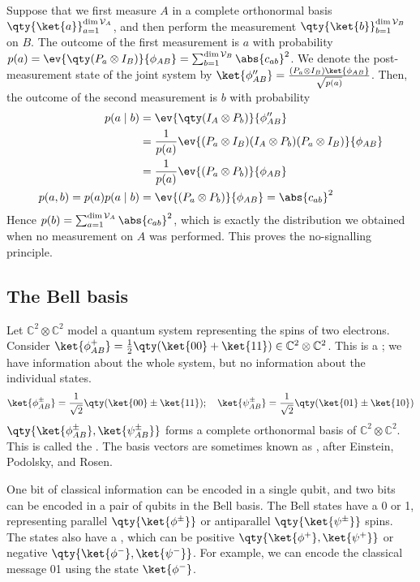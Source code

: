Suppose that we first measure $A$ in a complete orthonormal basis $\qty{\ket{a}}_{a=1}^{\dim \mathcal V_A}$, and then perform the measurement $\qty{\ket{b}}_{b=1}^{\dim \mathcal V_B}$ on $B$.
The outcome of the first measurement is $a$ with probability $p(a) = \ev{\qty(P_a \otimes I_B)}{\phi_{AB}} = \sum_{b=1}^{\dim \mathcal V_B} \abs{c_{ab}}^2$.
We denote the post-measurement state of the joint system by $\ket{\phi_{AB}''}= \frac{(P_a \otimes I_B) \ket{\phi_{AB}}}{\sqrt{p(a)}}$.
Then, the outcome of the second measurement is $b$ with probability
\begin{align*}
    p(a \mid b) &= \ev{\qty(I_A \otimes P_b)}{\phi_{AB}''} \\
    &= \frac{1}{p(a)} \ev{(P_a \otimes I_B) (I_A \otimes P_b) (P_a \otimes I_B)}{\phi_{AB}} \\
    &= \frac{1}{p(a)} \ev{(P_a \otimes P_b)}{\phi_{AB}} \\
    p(a,b) = p(a) p(a \mid b) &= \ev{(P_a \otimes P_b)}{\phi_{AB}} = \abs{c_{ab}}^2
\end{align*}
Hence $p(b) = \sum_{a=1}^{\dim \mathcal V_A} \abs{c_{ab}}^2$, which is exactly the distribution we obtained when no measurement on $A$ was performed.
This proves the no-signalling principle.

\subsection{The Bell basis}
Let $\mathbb C^2 \otimes \mathbb C^2$ model a quantum system representing the spins of two electrons.
Consider $\ket{\phi_{AB}^+} = \frac{1}{2}\qty(\ket{00} + \ket{11}) \in \mathbb C^2 \otimes \mathbb C^2$.
This is a ; we have information about the whole system, but no information about the individual states.
\[ \ket{\phi_{AB}^\pm} = \frac{1}{\sqrt{2}} \qty(\ket{00} \pm \ket{11});\quad \ket{\psi_{AB}^\pm} = \frac{1}{\sqrt{2}} \qty(\ket{01} \pm \ket{10}) \]
$\qty{\ket{\phi_{AB}^\pm}, \ket{\psi_{AB}^\pm}}$ forms a complete orthonormal basis of $\mathbb C^2 \otimes \mathbb C^2$.
This is called the .
The basis vectors are sometimes known as , after Einstein, Podolsky, and Rosen.

One bit of classical information can be encoded in a single qubit, and two bits can be encoded in a pair of qubits in the Bell basis.
The Bell states have a  0 or 1, representing parallel $\qty{\ket{\phi^\pm}}$ or antiparallel $\qty{\ket{\psi^\pm}}$ spins.
The states also have a , which can be positive $\qty{\ket{\phi^+}, \ket{\psi^+}}$ or negative $\qty{\ket{\phi^-}, \ket{\psi^-}}$.
For example, we can encode the classical message 01 using the state $\ket{\phi^-}$.


